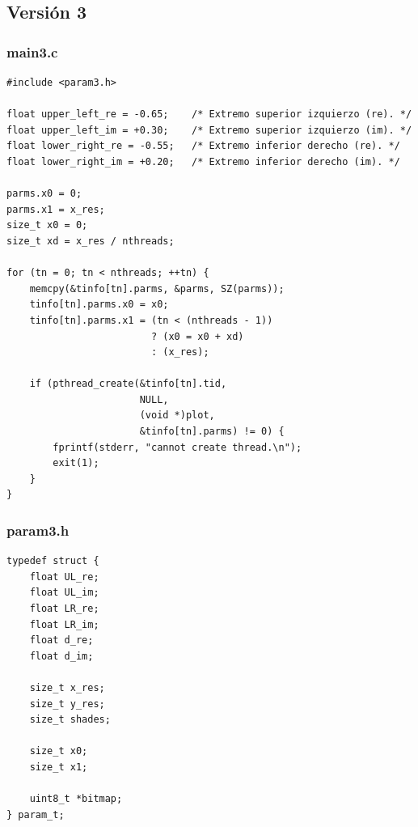 \documentclass[a4paper,10pt]{article}
\begin{document}
\subsection{Versión 3}
\subsubsection{main3.c}
\begin{verbatim}
#include <param3.h>

float upper_left_re = -0.65;	/* Extremo superior izquierzo (re). */
float upper_left_im = +0.30;	/* Extremo superior izquierzo (im). */
float lower_right_re = -0.55;	/* Extremo inferior derecho (re). */
float lower_right_im = +0.20;	/* Extremo inferior derecho (im). */

parms.x0 = 0;
parms.x1 = x_res;
size_t x0 = 0;
size_t xd = x_res / nthreads;

for (tn = 0; tn < nthreads; ++tn) {
	memcpy(&tinfo[tn].parms, &parms, SZ(parms));
	tinfo[tn].parms.x0 = x0;
	tinfo[tn].parms.x1 = (tn < (nthreads - 1))
	                     ? (x0 = x0 + xd)
	                     : (x_res);

	if (pthread_create(&tinfo[tn].tid, 
	                   NULL, 
	                   (void *)plot,
	                   &tinfo[tn].parms) != 0) {
		fprintf(stderr, "cannot create thread.\n");
		exit(1);
	}
}

\end{verbatim}
\subsubsection{param3.h}
\begin{verbatim}
typedef struct {
	float UL_re;
	float UL_im;
	float LR_re;
	float LR_im;
	float d_re;
	float d_im;

	size_t x_res;
	size_t y_res;
	size_t shades;

	size_t x0;
	size_t x1;

	uint8_t *bitmap;
} param_t;
\end{verbatim}
\end{document}

